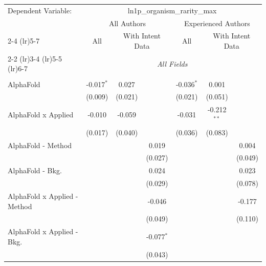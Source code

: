 \begingroup
\centering
\begin{tabular}{lcccccc}
   \tabularnewline \midrule \midrule
   Dependent Variable: & \multicolumn{6}{c}{ln1p\_organism\_rarity\_max}\\
 & \multicolumn{3}{c}{All Authors} & \multicolumn{3}{c}{Experienced Authors} \\
\cmidrule(lr){2-4} \cmidrule(lr){5-7}
 & \multicolumn{1}{c}{All} & \multicolumn{2}{c}{With Intent Data} & \multicolumn{1}{c}{All} & \multicolumn{2}{c}{With Intent Data} \\
\cmidrule(lr){2-2} \cmidrule(lr){3-4} \cmidrule(lr){5-5} \cmidrule(lr){6-7}
 & \multicolumn{6}{c}{\textit{All Fields}} \\ \\
   AlphaFold                      & -0.017$^{*}$ & 0.027       &              & -0.036$^{*}$ & 0.001          &   \\   
                                  & (0.009)      & (0.021)     &              & (0.021)      & (0.051)        &   \\   
   AlphaFold x Applied            & -0.010       & -0.059      &              & -0.031       & -0.212$^{**}$  &   \\   
                                  & (0.017)      & (0.040)     &              & (0.036)      & (0.083)        &   \\   
   AlphaFold - Method             &              &             & 0.019        &              &                & 0.004\\   
                                  &              &             & (0.027)      &              &                & (0.049)\\   
   AlphaFold - Bkg.               &              &             & 0.024        &              &                & 0.023\\   
                                  &              &             & (0.029)      &              &                & (0.078)\\   
   AlphaFold x Applied - Method   &              &             & -0.046       &              &                & -0.177\\   
                                  &              &             & (0.049)      &              &                & (0.110)\\   
   AlphaFold x Applied - Bkg.     &              &             & -0.077$^{*}$ &              &                &   \\   
                                  &              &             & (0.043)      &              &                &   \\   

\end{tabular}

